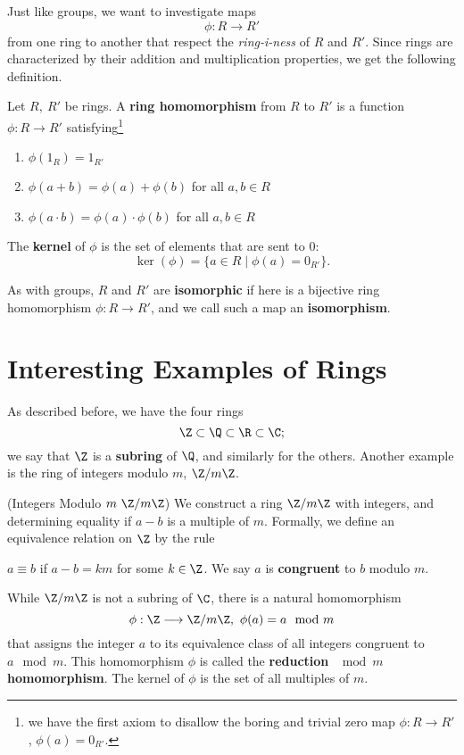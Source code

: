 \documentclass[math1530-lecture-notes]{subfiles}
\begin{document}
Just like groups, we want to investigate maps \[
  \phi:R\to R'
\] from one ring to another that respect the \textit{ring-i-ness} of $R$ and $R'$. Since rings are
characterized by their addition and multiplication properties, we get the following definition.

\begin{definition}{}
  Let $R,\ R'$ be rings. A \textbf{ring homomorphism} from $R$ to $R'$ is a function $\phi:R\to R'$ 
  satisfying\footnote{we have the first axiom to disallow the boring and trivial zero map $\phi:R\to
  R'$, $\phi(a)=0_{R'}$.}
  \begin{enumerate}
    \item $\phi(1_R)=1_{R'}$
    \item $\phi(a+b) = \phi(a) + \phi(b)$ for all $a,b\in R$
    \item $\phi(a\cdot b)=\phi(a)\cdot \phi(b)$ for all $a,b\in R$
  \end{enumerate}

  The \textbf{kernel} of $\phi$ is the set of elements that are sent to 0: \[
    \ker(\phi)=\{ a\in R \mid \phi(a)=0_{R'} \}
  .\] 

  As with groups, $R$ and $R'$ are \textbf{isomorphic} if here is a bijective ring homomorphism
  $\phi:R\to R'$, and we call such a map an \textbf{isomorphism}.
\end{definition}

\section{Interesting Examples of Rings}

As described before, we have the four rings \[
  \Z \subset \Q \subset \R \subset \C
;\] we say that $\Z$ is a \textbf{subring} of $\Q$, and similarly for the others. Another example is
the ring of integers modulo $m$, $ \Z / m\Z$.

\begin{example}
  (Integers Modulo $m~\Z / m\Z$) We construct a ring $\Z / m\Z$ with integers, and determining
  equality if $a-b$ is a multiple of $m$. Formally, we define an equivalence relation on $\Z$ by the
  rule \begin{center}
    $a\equiv b$ if $a-b=km$ for some $k\in \Z$. We say $a$ is \textbf{congruent} to $b$ modulo $m$.
  \end{center}
  While $\Z / m\Z$ is not a subring of $\C$, there is a natural homomorphism \[
    \phi: \Z \longrightarrow \Z / m\Z,\ \phi(a)=a\mod{m}
  \] that assigns the integer $a$ to its equivalence class of all integers congruent to $a\mod{m}$.
  This homomorphism $\phi$ is called the \textbf{reduction $\mod{m}$ homomorphism}. The kernel of
  $\phi$ is the set of all multiples of $m$.
\end{example}
\end{document}
